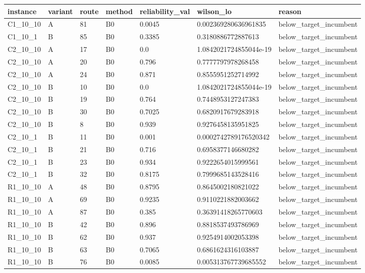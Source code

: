 \begin{tabular}{lllllll}
 \hline
 instance & variant & route & method & reliability\_val & wilson\_lo & reason \\
 \hline
 C1\_10\_10 & A & 81 & B0 & 0.0045 & 0.002369280636961835 & below\_target\_incumbent \\
 C1\_10\_1 & B & 85 & B0 & 0.3385 & 0.3180886772887613 & below\_target\_incumbent \\
 C2\_10\_10 & A & 17 & B0 & 0.0 & 1.0842021724855044e-19 & below\_target\_incumbent \\
 C2\_10\_10 & A & 20 & B0 & 0.796 & 0.7777797978268458 & below\_target\_incumbent \\
 C2\_10\_10 & A & 24 & B0 & 0.871 & 0.8555951252714992 & below\_target\_incumbent \\
 C2\_10\_10 & B & 10 & B0 & 0.0 & 1.0842021724855044e-19 & below\_target\_incumbent \\
 C2\_10\_10 & B & 19 & B0 & 0.764 & 0.7448953127247383 & below\_target\_incumbent \\
 C2\_10\_10 & B & 30 & B0 & 0.7025 & 0.6820917679283918 & below\_target\_incumbent \\
 C2\_10\_10 & B & 8 & B0 & 0.939 & 0.9276458135951825 & below\_target\_incumbent \\
 C2\_10\_1 & B & 11 & B0 & 0.001 & 0.0002742789176520342 & below\_target\_incumbent \\
 C2\_10\_1 & B & 21 & B0 & 0.716 & 0.6958377146680282 & below\_target\_incumbent \\
 C2\_10\_1 & B & 23 & B0 & 0.934 & 0.9222654015999561 & below\_target\_incumbent \\
 C2\_10\_1 & B & 32 & B0 & 0.8175 & 0.7999685143528416 & below\_target\_incumbent \\
 R1\_10\_10 & A & 48 & B0 & 0.8795 & 0.8645002180821022 & below\_target\_incumbent \\
 R1\_10\_10 & A & 69 & B0 & 0.9235 & 0.9110221882003662 & below\_target\_incumbent \\
 R1\_10\_10 & A & 87 & B0 & 0.385 & 0.36391418265770603 & below\_target\_incumbent \\
 R1\_10\_10 & B & 42 & B0 & 0.896 & 0.8818537493786969 & below\_target\_incumbent \\
 R1\_10\_10 & B & 62 & B0 & 0.937 & 0.9254914002053398 & below\_target\_incumbent \\
 R1\_10\_10 & B & 63 & B0 & 0.7065 & 0.6861624316103887 & below\_target\_incumbent \\
 R1\_10\_10 & B & 76 & B0 & 0.0085 & 0.005313767739685552 & below\_target\_incumbent \\

\end{tabular}
